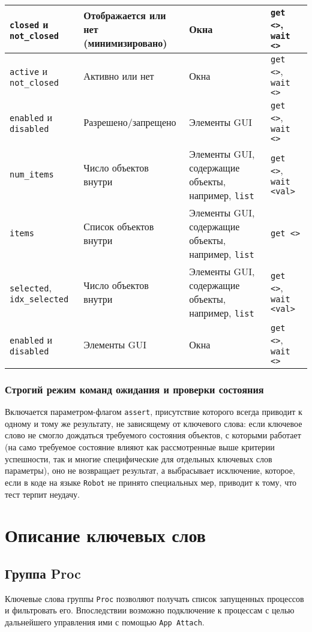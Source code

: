\documentclass[11pt]{book} %
\begin{document}
\begin{center}
\begin{tabular}{|p{90pt}|p{120pt}|p{100pt}|p{60pt}|}
		\verb|closed| и \verb|not_closed| & Отображается или нет (минимизировано) & Окна & \verb|get <>|,  \verb|wait <>|\\ \hline
		\verb|active| и \verb|not_closed| & Активно или нет & Окна & \verb|get <>|,  \verb|wait <>| \\ \hline
		\verb|enabled| и \verb|disabled| & Разрешено/запрещено & Элементы GUI & \verb|get <>|,  \verb|wait <>|\\ \hline
		\verb|num_items| & Число объектов внутри & Элементы GUI, содержащие объекты, например, \verb|list| & \verb|get <>|,  \verb|wait <val>|\\ \hline
		\verb|items| & Список объектов внутри & Элементы GUI, содержащие объекты, например, \verb|list| & \verb|get <>|\\ \hline		
		\verb|selected|,  \verb|idx_selected|& Число объектов внутри & Элементы GUI, содержащие объекты, например, \verb|list| & \verb|get <>|,  \verb|wait <val>|\\ \hline		
		
		\verb|enabled| и \verb|disabled| & Элементы GUI & Окна & \verb|get <>|,  \verb|wait <>|\\ \hline
		
	\end{tabular}
\end{center}


\subsection{Строгий режим команд ожидания и проверки состояния}

Включается параметром-флагом \verb|assert|, присутствие которого всегда приводит к одному и тому же результату, не зависящему от ключевого слова: если ключевое слово не смогло дождаться требуемого состояния объектов, с которыми работает (на само требуемое состояние влияют как рассмотренные выше критерии успешности, так и многие специфические для отдельных ключевых слов параметры), оно не возвращает результат, а выбрасывает исключение, которое, если в коде на языке \verb|Robot| не принято специальных мер, приводит к тому, что тест терпит неудачу.

\chapter{Описание ключевых слов}

\section{Группа Proc}
Ключевые слова группы \verb"Proc" позволяют получать список запущенных процессов и фильтровать его. Впоследствии возможно подключение к процессам с целью дальнейшего управления ими с помощью \verb"App Attach".
\end{document}
